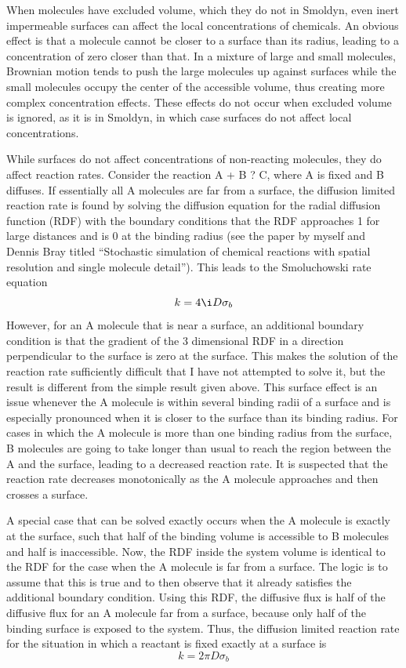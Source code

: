 \documentclass {book}
\begin{document}
When molecules have excluded volume, which they do not in Smoldyn, even inert impermeable surfaces can affect the local concentrations of chemicals. An obvious effect is that a molecule cannot be closer to a surface than its radius, leading to a concentration of zero closer than that. In a mixture of large and small molecules, Brownian motion tends to push the large molecules up against surfaces while the small molecules occupy the center of the accessible volume, thus creating more complex concentration effects. These effects do not occur when excluded volume is ignored, as it is in Smoldyn, in which case surfaces do not affect local concentrations.

While surfaces do not affect concentrations of non-reacting molecules, they do affect reaction rates. Consider the reaction A + B ? C, where A is fixed and B diffuses. If essentially all A molecules are far from a surface, the diffusion limited reaction rate is found by solving the diffusion equation for the radial diffusion function (RDF) with the boundary conditions that the RDF approaches 1 for large distances and is 0 at the binding radius (see the paper by myself and Dennis Bray titled ``Stochastic simulation of chemical reactions with spatial resolution and single molecule detail''). This leads to the Smoluchowski rate equation
$$k=4 \i D \sigma_b$$
However, for an A molecule that is near a surface, an additional boundary condition is that the gradient of the 3 dimensional RDF in a direction perpendicular to the surface is zero at the surface. This makes the solution of the reaction rate sufficiently difficult that I have not attempted to solve it, but the result is different from the simple result given above. This surface effect is an issue whenever the A molecule is within several binding radii of a surface and is especially pronounced when it is closer to the surface than its binding radius. For cases in which the A molecule is more than one binding radius from the surface, B molecules are going to take longer than usual to reach the region between the A and the surface, leading to a decreased reaction rate. It is suspected that the reaction rate decreases monotonically as the A molecule approaches and then crosses a surface.

A special case that can be solved exactly occurs when the A molecule is exactly at the surface, such that half of the binding volume is accessible to B molecules and half is inaccessible. Now, the RDF inside the system volume is identical to the RDF for the case when the A molecule is far from a surface. The logic is to assume that this is true and to then observe that it already satisfies the additional boundary condition. Using this RDF, the diffusive flux is half of the diffusive flux for an A molecule far from a surface, because only half of the binding surface is exposed to the system. Thus, the diffusion limited reaction rate for the situation in which a reactant is fixed exactly at a surface is
$$k = 2 \pi D \sigma_b$$
\end{document}
